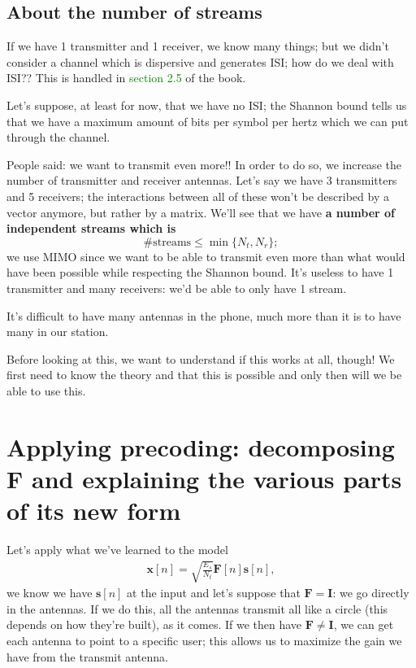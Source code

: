 \documentclass[a4paper, 12pt]{book}
\begin{document}
\subsection*{About the number of streams}

If we have 1 transmitter and 1 receiver, we know many things; but we didn't consider a channel which is dispersive and generates ISI; how do we deal with ISI?? This is handled in \textcolor{green}{section 2.5} of the book.

Let's suppose, at least for now, that we have no ISI; the Shannon bound tells us that we have a maximum amount of bits per symbol per hertz which we can put through the channel.

People said: we want to transmit even more!! In order to do so, we increase the number of transmitter and receiver antennas.
Let's say we have 3 transmitters and 5 receivers; the interactions between all of these won't be described by a vector anymore, but rather by a matrix.
We'll see that we have \textbf{a number of independent streams which is}
\[ \# \text{streams} \leq \min \{N_t, N_r\}; \]
we use MIMO since we want to be able to transmit even more than what would have been possible while respecting the Shannon bound.
It's useless to have 1 transmitter and many receivers: we'd be able to only have 1 stream.

It's difficult to have many antennas in the phone, much more than it is to have many in our station.

Before looking at this, we want to understand if this works at all, though! We first need to know the theory and that this is possible and only then will we be able to use this.

\section[Applying precoding]{Applying precoding: decomposing F and explaining the various parts of its new form}

Let's apply what we've learned to the model
\begin{align}
\mathbf{x}[n] = \sqrt{\frac{E_s}{N_t}} \mathbf{F}[n]\mathbf{s}[n], \tag{2.98}
\end{align}
we know we have $\mathbf{s}[n]$ at the input and let's suppose that $\mathbf{F} = \mathbf{I}$: we go directly in the antennas. If we do this, all the antennas transmit all like a circle (this depends on how they're built), as it comes.
If we then have $\mathbf{F} \neq \mathbf{I}$, we can get each antenna to point to a specific user; this allows us to maximize the gain we have from the transmit antenna.
\end{document}
